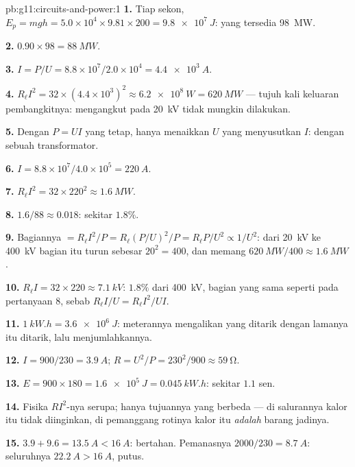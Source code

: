 \begin{solution}{pb:g11:circuits-and-power:1}
\textbf{1.} Tiap sekon, $E_p = mgh = 5.0\times10^{4} \times 9.81 \times
200 = \qty{9.8e7}{J}$:  yang tersedia \qty{98}{MW}.

\textbf{2.} $0.90 \times 98 = \qty{88}{MW}$.

\textbf{3.} $I = P/U = 8.8\times10^{7}/2.0\times10^{4} = \qty{4.4e3}{A}$.

\textbf{4.} $R_\ell I^2 = 32 \times (4.4\times10^{3})^2 \approx
\qty{6.2e8}{W} = \qty{620}{MW}$ --- tujuh kali keluaran pembangkitnya:
mengangkut  pada \qty{20}{kV} tidak mungkin dilakukan.

\textbf{5.} Dengan $P = UI$ yang tetap, hanya menaikkan $U$ yang
menyusutkan $I$: dengan sebuah transformator.

\textbf{6.} $I = 8.8\times10^{7}/4.0\times10^{5} = \qty{220}{A}$.

\textbf{7.} $R_\ell I^2 = 32 \times 220^2 \approx \qty{1.6}{MW}$.

\textbf{8.} $1.6/88 \approx 0.018$: sekitar $1.8\%$.

\textbf{9.} Bagiannya $= R_\ell I^2/P = R_\ell (P/U)^2/P = R_\ell P/U^2
\propto 1/U^2$: dari \qty{20}{kV} ke \qty{400}{kV} bagian itu turun
sebesar $20^2 = 400$, dan memang
$\qty{620}{MW}/400 \approx \qty{1.6}{MW}$.

\textbf{10.} $R_\ell I = 32 \times 220 \approx \qty{7.1}{kV}$: $1.8\%$
dari \qty{400}{kV}, bagian yang sama seperti pada pertanyaan 8, sebab
$R_\ell I/U = R_\ell I^2/UI$.

\textbf{11.} $\qty{1}{kW.h} = \qty{3.6e6}{J}$: meterannya mengalikan
 yang ditarik dengan lamanya  itu ditarik, lalu menjumlahkannya.

\textbf{12.} $I = 900/230 = \qty{3.9}{A}$;
$R = U^2/P = 230^2/900 \approx \qty{59}{\ohm}$.

\textbf{13.} $E = 900 \times 180 = \qty{1.6e5}{J} = \qty{0.045}{kW.h}$:
sekitar $1.1$ sen.

\textbf{14.} Fisika $RI^2$-nya serupa; hanya tujuannya yang berbeda ---
di salurannya kalor itu tidak diinginkan, di pemanggang rotinya kalor
itu \emph{adalah} barang jadinya.

\textbf{15.} $3.9 + 9.6 = \qty{13.5}{A} < \qty{16}{A}$: bertahan.
Pemanasnya $2000/230 = \qty{8.7}{A}$: seluruhnya
$\qty{22.2}{A} > \qty{16}{A}$,  putus.


\end{solution}
